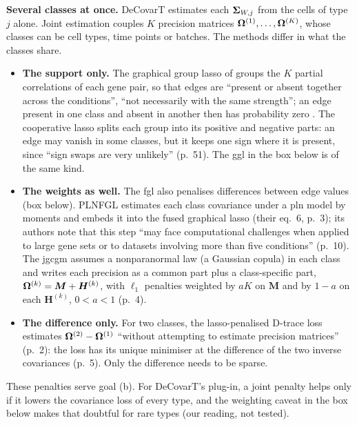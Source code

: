 \documentclass[11pt,a4paper]{article}
\begin{document}
\textbf{Several classes at once.} DeCovarT estimates each $\bm{\Sigma}_{W,j}$ from the cells of type $j$ alone. Joint
estimation couples $K$ precision matrices $\bm{\Omega}^{(1)},\dots,\bm{\Omega}^{(K)}$, whose classes can be cell
types, time points or batches. The methods differ in what the classes share.
\begin{itemize}
  \item \textbf{The support only.} The graphical group lasso of
        \textcite{chiquetInferringMultipleGraphical2011} groups the $K$ partial correlations of each gene
        pair, so that edges are \enquote{present or absent together across the conditions}, \enquote{not
        necessarily with the same strength}; an edge present in one class and absent in another then has
        probability zero \parencite[p.~51]{chiquetContributionsSparseMethods2015}. The cooperative lasso
        splits each group into its positive and negative parts: an edge may vanish in some classes, but
        it keeps one sign where it is present, since \enquote{sign swaps are very unlikely} (p.~51). The
        \gls{ggl} in the box below is of the same kind.
  \item \textbf{The weights as well.} The \gls{fgl} \parencite{danaherJointGraphicalLasso2012} also
        penalises differences between edge values (box below). PLNFGL
        \parencite{zhaiPLNFGLJointEstimation2026} estimates each class covariance under a \gls{pln} model
        by moments and embeds it into the fused graphical lasso (their eq.~6, p.~3); its authors note that
        this step \enquote{may face computational challenges when applied to large gene sets or to
        datasets involving more than five conditions} (p.~10). The \gls{jgcgm} \parencite{wuJointLearningMultiple2020} assumes a nonparanormal law (a Gaussian copula) in each class and
        writes each precision as a common part plus a class-specific part,
        $\bm{\Omega}^{(k)}=\bm M+\bm H^{(k)}$, with $\ell_1$ penalties weighted by $aK$ on $\bm M$ and by
        $1-a$ on each $\bm H^{(k)}$, $0<a<1$ (p.~4).
  \item \textbf{The difference only.} For two classes, the lasso-penalised D-trace loss
        \parencite{yuanDifferentialNetworkAnalysis2017} estimates $\bm{\Omega}^{(2)}-\bm{\Omega}^{(1)}$
        \enquote{without attempting to estimate precision matrices} (p.~2): the loss has its unique
        minimiser at the difference of the two inverse covariances (p.~5). Only the difference needs to be
        sparse.
\end{itemize}
These penalties serve goal (b). For DeCovarT's plug-in, a joint penalty helps only if it lowers the
covariance loss of every type, and the weighting caveat in the box below makes that doubtful for rare
types (our reading, not tested).
\end{document}
